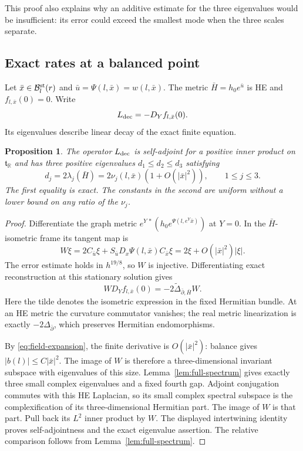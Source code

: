 \documentclass[11pt]{amsart}
\newtheorem{proposition}[theorem]{Proposition}
\theoremstyle{definition}
\theoremstyle{remark}
\newcommand{\RR}{\mathbb R}
\begin{document}
This proof also explains why an additive estimate for the three
eigenvalues would be insufficient: its error could exceed the
smallest mode when the three scales separate.

\subsection{Exact rates at a balanced point}
Let $\bar x\in\mathcal B_l^{\rm st}(r)$ and
$\bar u=\Psi(l,\bar x)=w(l,\bar x)$.
The metric $\bar H=h_0e^{\bar u}$ is HE and
$f_{l,\bar x}(0)=0$. Write
\[
 L_{\rm dec}=-D_Yf_{l,\bar x}(0).
\]
Its eigenvalues describe linear decay of the exact finite equation.

\begin{proposition}\label{prop:equilibrium-rates}
The operator $L_{\rm dec}$ is self-adjoint for a positive inner
product on $\mathfrak t_{\RR}$ and has three positive eigenvalues
$d_1\le d_2\le d_3$ satisfying
\begin{equation}\label{eq:exact-rates}
 d_j=2\lambda_j(\bar H)
       =2\nu_j(l,\bar x)(1+O(|\bar x|^2)),\qquad 1\le j\le3 .
\end{equation}
The first equality is exact. The constants in the second are
uniform without a lower bound on any ratio of the $\nu_j$.
\end{proposition}
\begin{proof}
Differentiate the graph metric
$e^{Y\,*}(h_0e^{\Psi(l,e^Y\bar x)})$ at $Y=0$.
In the $\bar H$-isometric frame its tangent map is
\begin{equation}\label{eq:equilibrium-tangent}
 W\xi=2C_{\bar u}\xi+
          S_{\bar u}D_x\Psi(l,\bar x)C_{\bar x}\xi
       =2\xi+O(|\bar x|^2)|\xi|.
\end{equation}
The error estimate holds in $h^{19/8}$, so $W$ is injective.
Differentiating exact reconstruction at this stationary solution
gives
\[
 W D_Yf_{l,\bar x}(0)=-2\widetilde\Delta_{\bar\partial,\bar H}W.
\]
Here the tilde denotes the isometric expression in the fixed
Hermitian bundle. At an HE metric the curvature commutator vanishes;
the real metric linearization is exactly $-2\Delta_{\bar\partial}$,
which preserves Hermitian endomorphisms.

By \eqref{eq:field-expansion}, the finite derivative is
$O(|\bar x|^2)$: balance gives $|b(l)|\le C|\bar x|^2$.
The image of $W$ is therefore a three-dimensional invariant
subspace with eigenvalues of this size. Lemma~\ref{lem:full-spectrum}
gives exactly three small complex eigenvalues and a fixed fourth
gap. Adjoint conjugation commutes with this HE Laplacian, so its
small complex spectral subspace is the complexification of its
three-dimensional Hermitian part. The image of $W$ is that part.
Pull back its $L^2$ inner product by $W$. The displayed
intertwining identity proves self-adjointness and the exact
eigenvalue assertion. The relative comparison follows from
Lemma~\ref{lem:full-spectrum}.
\end{proof}
\end{document}
